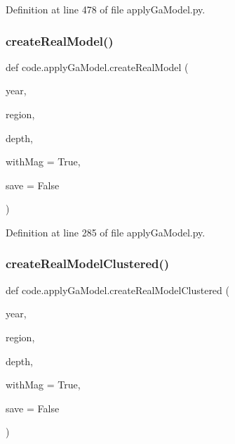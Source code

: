 Definition at line 478 of file apply\+Ga\+Model.\+py.

\mbox{\label{namespacecode_1_1apply_ga_model_a25291bb4b244e8aca5f2d0d62a730f4e}} 
\subsubsection{\texorpdfstring{create\+Real\+Model()}{createRealModel()}}
{\footnotesize\ttfamily def code.\+apply\+Ga\+Model.\+create\+Real\+Model (\begin{DoxyParamCaption}\item[{}]{year,  }\item[{}]{region,  }\item[{}]{depth,  }\item[{}]{with\+Mag = {\ttfamily True},  }\item[{}]{save = {\ttfamily False} }\end{DoxyParamCaption})}



Definition at line 285 of file apply\+Ga\+Model.\+py.

\mbox{\label{namespacecode_1_1apply_ga_model_aecf1ec64a012bf27f9d3acd65b991e3a}} 
\subsubsection{\texorpdfstring{create\+Real\+Model\+Clustered()}{createRealModelClustered()}}
{\footnotesize\ttfamily def code.\+apply\+Ga\+Model.\+create\+Real\+Model\+Clustered (\begin{DoxyParamCaption}\item[{}]{year,  }\item[{}]{region,  }\item[{}]{depth,  }\item[{}]{with\+Mag = {\ttfamily True},  }\item[{}]{save = {\ttfamily False} }\end{DoxyParamCaption})}



